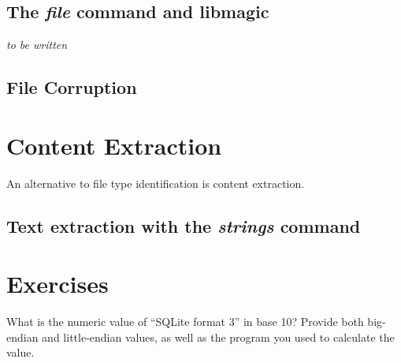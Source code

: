 \subsection{The \emph{file} command and libmagic}

\emph{to be written}

\subsection{File Corruption}

\section{Content Extraction}

An alternative to file type identification is content extraction.

\subsection{Text extraction with the \emph{strings} command}



\section{Exercises}

What is the numeric value of ``SQLite format 3'' in base 10? Provide
both big-endian and little-endian values, as well as the  program you
used to calculate the value. 


